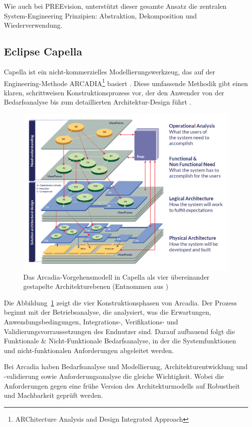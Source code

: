 Wie auch bei PREEvision, unterstützt dieser gesamte Ansatz die zentralen System-Engineering Prinzipien: Abstraktion, Dekomposition und Wiederverwendung\cite{themathworksinc.2025system}.

\subsection{Eclipse Capella}
Capella ist ein nicht-kommerzielles Modellierungswerkzeug, das auf der Engineering-Methode ARCADIA\footnote{ARChitecture Analysis and Design Integrated Approach} basiert \cite{roques2016mbse}. Diese umfassende Methodik gibt einen klaren, schrittweisen Konstruktionsprozess vor, der den Anwender von der Bedarfsanalyse bis zum detaillierten Architektur-Design führt \cite{let}.

\begin{figure}[h!]
  \centering
  \includegraphics[width=.7\textwidth]{figures/03StandDerTechnik/phases_arcadia.png}
  \caption{Das Arcadia-Vorgehensmodell in Capella als vier übereinander gestapelte Architekturebenen (Entnommen aus \cite{let})}
  \label{fig:capella_modell}
\end{figure}

Die Abbildung~\ref{fig:capella_modell} zeigt die vier Konstruktionsphasen von Arcadia. Der Prozess beginnt mit der Betriebsanalyse, die analysiert, was die Erwartungen, Anwendungsbedingungen, Integrations-, Verifikations- und Validierungsvorraussetzungen des Endnutzer sind. Darauf aufbauend folgt die Funktionale \& Nicht-Funktionale Bedarfsanalyse, in der die Systemfunktionen und nicht-funktionalen Anforderungen abgeleitet werden.

Bei Arcadia haben Bedarfsanalyse und Modellierung, Architekturentwicklung und -validierung sowie Anforderungsanalyse die gleiche Wichtigkeit. Wobei die Anforderungen gegen eine frühe Version des Architekturmodells auf Robustheit und Machbarkeit geprüft werden.

